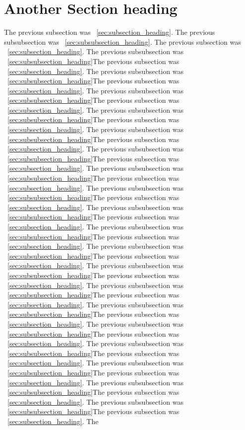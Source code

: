 \documentclass[twocolumn,11pt,twoside]{article}
\begin{document}
\section{Another Section heading}
The previous subsection was ~\ref{sec:subsection_heading}.  The
previous subsubsection was ~\ref{sec:subsubsection_heading}. The previous subsection was ~\ref{sec:subsection_heading}.  The
previous subsubsection was ~\ref{sec:subsubsection_heading}The previous subsection was ~\ref{sec:subsection_heading}.  The
previous subsubsection was ~\ref{sec:subsubsection_heading}The previous subsection was ~\ref{sec:subsection_heading}.  The
previous subsubsection was ~\ref{sec:subsubsection_heading}The previous subsection was ~\ref{sec:subsection_heading}.  The
previous subsubsection was ~\ref{sec:subsubsection_heading}The previous subsection was ~\ref{sec:subsection_heading}.  The
previous subsubsection was ~\ref{sec:subsubsection_heading}The previous subsection was ~\ref{sec:subsection_heading}.  The
previous subsubsection was ~\ref{sec:subsubsection_heading}The previous subsection was ~\ref{sec:subsection_heading}.  The
previous subsubsection was ~\ref{sec:subsubsection_heading}The previous subsection was ~\ref{sec:subsection_heading}.  The
previous subsubsection was ~\ref{sec:subsubsection_heading}The previous subsection was ~\ref{sec:subsection_heading}.  The
previous subsubsection was ~\ref{sec:subsubsection_heading}The previous subsection was ~\ref{sec:subsection_heading}.  The
previous subsubsection was ~\ref{sec:subsubsection_heading}The previous subsection was ~\ref{sec:subsection_heading}.  The
previous subsubsection was ~\ref{sec:subsubsection_heading}The previous subsection was ~\ref{sec:subsection_heading}.  The
previous subsubsection was ~\ref{sec:subsubsection_heading}The previous subsection was ~\ref{sec:subsection_heading}.  The
previous subsubsection was ~\ref{sec:subsubsection_heading}The previous subsection was ~\ref{sec:subsection_heading}.  The
previous subsubsection was ~\ref{sec:subsubsection_heading}The previous subsection was ~\ref{sec:subsection_heading}.  The
previous subsubsection was ~\ref{sec:subsubsection_heading}The previous subsection was ~\ref{sec:subsection_heading}.  The
previous subsubsection was ~\ref{sec:subsubsection_heading}The previous subsection was ~\ref{sec:subsection_heading}.  The
previous subsubsection was ~\ref{sec:subsubsection_heading}The previous subsection was ~\ref{sec:subsection_heading}.  The
previous subsubsection was ~\ref{sec:subsubsection_heading}The previous subsection was ~\ref{sec:subsection_heading}.  The
previous subsubsection was ~\ref{sec:subsubsection_heading}The previous subsection was ~\ref{sec:subsection_heading}.  The
\end{document}
